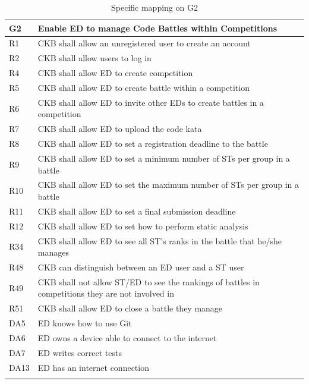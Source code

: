   \begin{longtable}{|l|p{12cm}| }
    \hline
    \textbf{G2} & \textbf{Enable ED to manage Code Battles within Competitions}      \\
    \hline
    R1 & CKB shall allow an unregistered user to create an account \\
    \hline
    R2 & CKB shall allow users to log in \\
    \hline
    R4 & CKB shall allow ED to create competition \\
    \hline
    R5 & CKB shall allow ED to create battle within a competition \\
    \hline
    R6 & CKB shall allow ED to invite other EDs to create battles in a competition \\
    \hline
    R7 & CKB shall allow ED to upload the code kata \\
    \hline
    R8 & CKB shall allow ED to set a registration deadline to the battle \\
    \hline
    R9 & CKB shall allow ED to set a minimum number of STs per group in a battle \\
    \hline
    R10 & CKB shall allow ED to set the maximum number of STs per group in a battle \\
    \hline
    R11 & CKB shall allow ED to set a final submission deadline \\
    \hline
    R12 & CKB shall allow ED to set how to perform static analysis \\
    \hline
    R34 & CKB shall allow ED to see all ST’s ranks in the battle that he/she manages \\
    \hline
    R48 & CKB can distinguish between an ED user and a ST user \\
    \hline
    R49 & CKB shall not allow ST/ED to see the rankings of battles in competitions they are not involved in \\
    \hline
    R51 & CKB shall allow ED to close a battle they manage \\
    \hline
    DA5 & ED knows how to use Git \\
    \hline
    DA6 & ED owns a device able to connect to the internet \\
    \hline
    DA7 & ED writes correct tests \\
    \hline
    DA13 & ED has an internet connection \\
    \hline

    \caption{Specific mapping on G2}
    \label{tab:mappingG2}
  \end{longtable}

